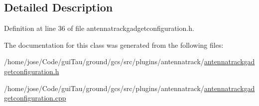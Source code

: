 \subsection{Detailed Description}


Definition at line 36 of file antennatrackgadgetconfiguration.\-h.



The documentation for this class was generated from the following files\-:\begin{DoxyCompactItemize}
\item 
/home/jose/\-Code/gui\-Tau/ground/gcs/src/plugins/antennatrack/\hyperlink{antennatrackgadgetconfiguration_8h}{antennatrackgadgetconfiguration.\-h}\item 
/home/jose/\-Code/gui\-Tau/ground/gcs/src/plugins/antennatrack/\hyperlink{antennatrackgadgetconfiguration_8cpp}{antennatrackgadgetconfiguration.\-cpp}\end{DoxyCompactItemize}
